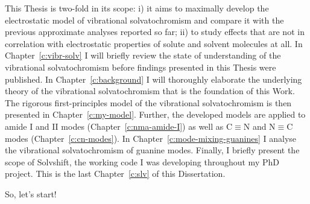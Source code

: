 \documentclass[a4paper,titlepage,twoside,fleqn,12pt]{book}
\begin{document}
\begin{refsection}
This Thesis is two\hyp{}fold in its scope: i) it aims to maximally develop
the electrostatic model of vibrational solvatochromism and compare it
with the previous approximate analyses reported so far; ii) to
study effects that are not in correlation with electrostatic properties
of solute and solvent molecules at all. In Chapter~\ref{c:vibr-solv} I will 
briefly review the state of understanding of the vibrational solvatochromism
before findings presented in this Thesis were published. In Chapter~\ref{c:background}
I will thoroughly elaborate the underlying theory of the vibrational
solvatochromism that is the foundation of this Work. The rigorous first\hyp{}principles
model of the vibrational solvatochromism is then presented in Chapter~\ref{c:my-model}.
Further, the developed models are applied to amide I and II modes (Chapter~\ref{c:nma-amide-I})
as well as
C$\equiv$N and N$\equiv$C modes (Chapter~\ref{c:cn-modes}). In Chapter~\ref{c:mode-mixing-guanines}
I analyse the vibrational solvatochromism of guanine modes. Finally,
I briefly present the scope of {\sc Solvshift}, the working code I was developing throughout
my PhD project. This is the last Chapter~\ref{c:slv} of this Dissertation.


So, let's start!

\printbibliography[heading=subbibintoc,title={References}]
\end{refsection}
\end{document}
